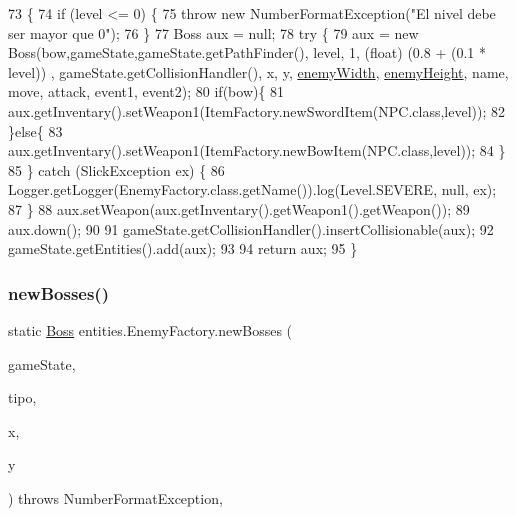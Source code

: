 \begin{DoxyCode}
73                                                                                                            
                                                                                                    \{
74         \textcolor{keywordflow}{if} (level <= 0) \{
75             \textcolor{keywordflow}{throw} \textcolor{keyword}{new} NumberFormatException(\textcolor{stringliteral}{"El nivel debe ser mayor que 0"});
76         \}
77         Boss aux = null;
78         \textcolor{keywordflow}{try} \{
79             aux = \textcolor{keyword}{new} Boss(bow,gameState,gameState.getPathFinder(), level, 1, (float) (0.8 + (0.1 * level))
      , gameState.getCollisionHandler(), x, y, \mbox{\hyperlink{classentities_1_1_enemy_factory_a3396d252fc506310c58e3a32494bbe36}{enemyWidth}}, \mbox{\hyperlink{classentities_1_1_enemy_factory_aa4632fbf138ccc9cc222e7437ccd8284}{enemyHeight}}, name, move, attack, 
      event1, event2);
80             \textcolor{keywordflow}{if}(bow)\{
81                 aux.getInventary().setWeapon1(ItemFactory.newSwordItem(NPC.class,level));
82             \}\textcolor{keywordflow}{else}\{
83                 aux.getInventary().setWeapon1(ItemFactory.newBowItem(NPC.class,level));
84             \}
85         \} \textcolor{keywordflow}{catch} (SlickException ex) \{
86             Logger.getLogger(EnemyFactory.class.getName()).log(Level.SEVERE, null, ex);
87         \}
88         aux.setWeapon(aux.getInventary().getWeapon1().getWeapon());
89         aux.down();
90 
91         gameState.getCollisionHandler().insertCollisionable(aux);
92         gameState.getEntities().add(aux);
93 
94         \textcolor{keywordflow}{return} aux;
95     \}
\end{DoxyCode}
\mbox{\label{classentities_1_1_enemy_factory_a49f6ba447fc11bc377d2dcc5812747ce}} 
\subsubsection{\texorpdfstring{new\+Bosses()}{newBosses()}}
{\footnotesize\ttfamily static \mbox{\hyperlink{classentities_1_1_boss}{Boss}} entities.\+Enemy\+Factory.\+new\+Bosses (\begin{DoxyParamCaption}\item[{final \mbox{\hyperlink{classstates_1_1_game_state}{Game\+State}}}]{game\+State,  }\item[{int}]{tipo,  }\item[{int}]{x,  }\item[{int}]{y }\end{DoxyParamCaption}) throws Number\+Format\+Exception\hspace{0.3cm}{\ttfamily [inline]}, {\ttfamily [static]}}


